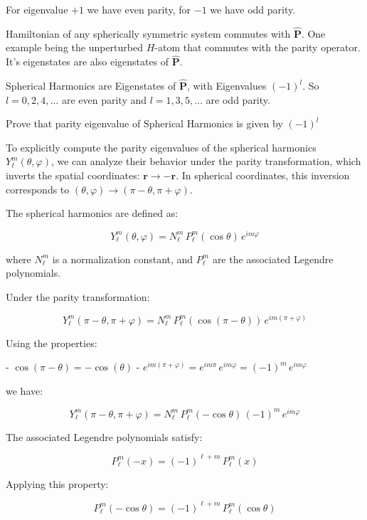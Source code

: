 \documentclass[10pt]{article}
\renewcommand{\vec}{\mathbf}
\renewcommand{\vec}{\mathbf}
\begin{document}
For eigenvalue $+1$ we have even parity, for $-1$ we have odd parity.

Hamiltonian of any spherically symmetric system commutes with $\hat{\vec{P}}$. One example being the unperturbed $H$-atom that commutes with the parity operator. It's eigenstates are also eigenstates of $\hat{\vec{P}}$.

Spherical Harmonics are Eigenstates of $\hat{\vec{P}}$, with Eigenvalues $(-1)^{l}$. So $l = 0,2,4, \ldots$ are even parity and $l = 1, 3, 5, \ldots$ are odd parity.

\begin{prob}Prove that parity eigenvalue of Spherical Harmonics is given by $(-1)^{l}$ 
	\end{prob} 
	\begin{solu}
		\begin{small} 
To explicitly compute the parity eigenvalues of the spherical harmonics \( Y_\ell^m(\theta, \varphi) \), we can analyze their behavior under the parity transformation, which inverts the spatial coordinates: \( \mathbf{r} \rightarrow -\mathbf{r} \). In spherical coordinates, this inversion corresponds to \( (\theta, \varphi) \rightarrow (\pi - \theta, \pi + \varphi) \).

The spherical harmonics are defined as:

\[ Y_\ell^m(\theta, \varphi) = N_\ell^m \, P_\ell^m(\cos \theta) \, e^{i m \varphi} \]

where \( N_\ell^m \) is a normalization constant, and \( P_\ell^m \) are the associated Legendre polynomials.

Under the parity transformation:

\[ Y_\ell^m(\pi - \theta, \pi + \varphi) = N_\ell^m \, P_\ell^m(\cos(\pi - \theta)) \, e^{i m (\pi + \varphi)} \]

Using the properties:

- \( \cos(\pi - \theta) = -\cos(\theta) \)
- \( e^{i m (\pi + \varphi)} = e^{i m \pi} \, e^{i m \varphi} = (-1)^m \, e^{i m \varphi} \)

we have:

\[ Y_\ell^m(\pi - \theta, \pi + \varphi) = N_\ell^m \, P_\ell^m(-\cos \theta) \, (-1)^m \, e^{i m \varphi} \]

The associated Legendre polynomials satisfy:

\[ P_\ell^m(-x) = (-1)^{\ell + m} \, P_\ell^m(x) \]

Applying this property:

\[ P_\ell^m(-\cos \theta) = (-1)^{\ell + m} \, P_\ell^m(\cos \theta) \]


\end{small}
\end{solu}
\end{document}
